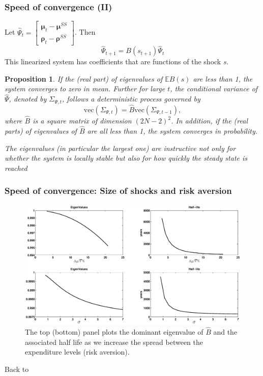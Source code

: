 \documentclass{beamer}
\newcommand{\bmat}{\begin{matrix}}
\newcommand{\emat}{\end{matrix}}
\newtheorem{proposition}{Proposition}
\begin{document}
\begin{frame}
\frametitle{Speed of convergence  (II) }
Let $\hat{\Psi}_{t}= \left[\bmat \bm{\mu}_{t} - \bm{\mu}^{SS}\\ \bm \rho_t - \bm \rho^{SS}\emat\right]$. Then
\begin{equation*}
 \hat{\Psi}_{t+1}=B(s_{t+1})\hat{\Psi}_t
\end{equation*}
This linearized system has coefficients that are functions of the shock $s$.
\small

\begin{proposition}\label{prop: localstability}
If the (real part) of eigenvalues of $\mathbb{E}B(s)$ are less than 1,  the system  converges to zero  in mean. Further for large $t$, the conditional variance of $\hat{\Psi}$, denoted by $\Sigma_{\Psi,t}$, follows a deterministic process governed by
\[\text{vec}(\Sigma_{\Psi,t})=\hat{B} \text{vec}(\Sigma_{\Psi,t-1}),\]	
where $\hat{B}$ is a square matrix of dimension $(2N-2)^2$. In addition,  if the (real parts) of eigenvalues of $\hat{B}$ are all less than 1, the system converges in probability.
\end{proposition}

\color{red}\emph{The eigenvalues (in particular the largest one) are instructive not only for whether the system is locally stable but also for how quickly the steady state is reached}

\end{frame}

\begin{frame}
\frametitle{Speed of convergence: Size of shocks and risk aversion}

  \begin{figure}[htp]
  \tiny
 \centering
 \includegraphics[width=\textwidth]{Draft25Graphs/eigenvalues.eps}
 \caption{\tiny{The top (bottom) panel plots the dominant eigenvalue of $\hat{B}$ and the associated half life as we increase
the spread between the expenditure levels (risk aversion).}}
 \label{fig: Eigenvalues}
 \end{figure}
 Back to \hyperlink{main}{}
 \end{frame}
 
\end{document}
